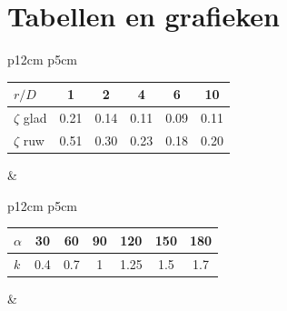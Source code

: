 \chapter{Tabellen en grafieken}
\label{sec:Tabellen en grafieken}

\makeatletter
\setlength{\@fptop}{0pt}
\makeatother
\captionsetup{justification=justified,singlelinecheck=false}

\begin{tabular}[t]{p{12cm} p{5cm}}
	\begin{tabular}{l c c c c c}
		$r/D$        & 1    & 2    & 4    & 6    & 10   \\
		\hline
		$\zeta$ glad & 0.21 & 0.14 & 0.11 & 0.09 & 0.11 \\
		$\zeta$ ruw  & 0.51 & 0.30 & 0.23 & 0.18 & 0.20 \\
	\end{tabular}
	&
\end{tabular}

\begin{tabular}[t]{p{12cm} p{5cm}}
	\begin{tabular}{l c c c c c c}
		$\alpha$ & 30\deg & 60\deg & 90\deg & 120\deg & 150\deg & 180\deg   \\ 
		\hline
		$k$    & 0.4    & 0.7    & 1      & 1.25    & 1.5     & 1.7 \\
	\end{tabular}
	&
\end{tabular}

